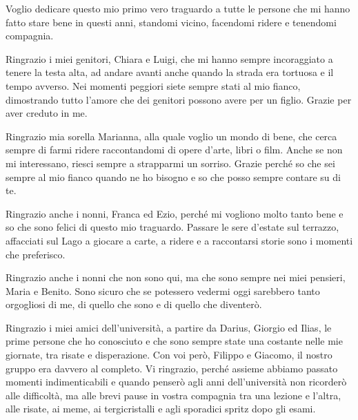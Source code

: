 \newenvironment{dedication}
    {
    \clearpage %
    \thispagestyle{empty} %
    \vspace*{\stretch{1}} %
    \begin{center}\begin{em}}
    {\end{em}\end{center}
    \vspace*{\stretch{2}} %
    \clearpage %
    }



\begin{dedication}
  Voglio dedicare questo mio primo vero traguardo a tutte le persone che mi hanno fatto stare bene in questi anni, standomi vicino, facendomi ridere e tenendomi compagnia. 

  Ringrazio i miei genitori, Chiara e Luigi, che mi hanno sempre incoraggiato a tenere la testa alta, ad andare avanti anche quando la strada era tortuosa e il tempo avverso. Nei momenti peggiori siete sempre stati al mio fianco, dimostrando tutto l'amore che dei genitori possono avere per un figlio. Grazie per aver creduto in me.

  Ringrazio mia sorella Marianna, alla quale voglio un mondo di bene, che cerca sempre di farmi ridere raccontandomi di opere d'arte, libri o film. Anche se non mi interessano, riesci sempre a strapparmi un sorriso. Grazie perché so che sei sempre al mio fianco quando ne ho bisogno e so che posso sempre contare su di te. 

  Ringrazio anche i nonni, Franca ed Ezio, perché mi vogliono molto tanto bene e so che sono felici di questo mio traguardo. Passare le sere d'estate sul terrazzo, affacciati sul Lago a giocare a carte, a ridere e a raccontarsi storie sono i momenti che preferisco. 

  Ringrazio anche i nonni che non sono qui, ma che sono sempre nei miei pensieri, Maria e Benito. Sono sicuro che se potessero vedermi oggi sarebbero tanto orgogliosi di me, di quello che sono e di quello che diventerò. 

  \vspace{2cm}


  Ringrazio i miei amici dell'università, a partire da Darius, Giorgio ed Ilias, le prime persone che ho conosciuto e che sono sempre state una costante nelle mie giornate, tra risate e disperazione. Con voi però, Filippo e Giacomo, il nostro gruppo era davvero al completo. Vi ringrazio, perché assieme abbiamo passato momenti indimenticabili e quando penserò agli anni dell'università non ricorderò alle difficoltà, ma alle brevi pause in vostra compagnia tra una lezione e l'altra, alle risate, ai meme, ai tergicristalli e agli sporadici spritz dopo gli esami. 


\end{dedication}
